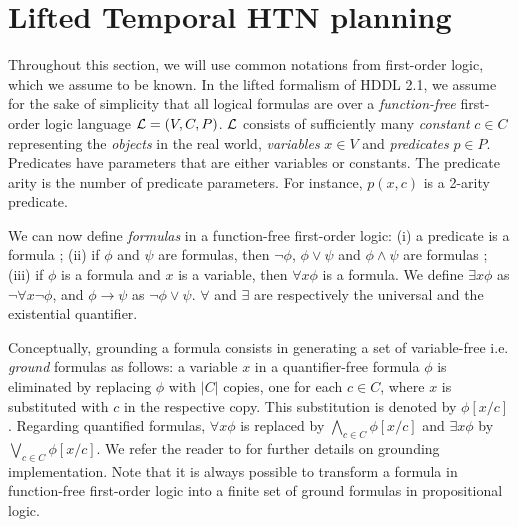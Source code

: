 \documentclass[letterpaper]{article} %
\begin{document}
\section{Lifted Temporal HTN planning}


Throughout this section, we will use common notations from first-order logic, which we assume to be known. In the lifted formalism of HDDL 2.1, we assume for the sake of simplicity that all logical formulas are over a {\it function-free} first-order logic language ${\cal{L}} = (V, C, P)$. ${\cal{L}}$ consists of sufficiently many {\it constant} $c \in C$ representing the {\it objects} in the real world, {\it variables} $x \in V$ and {\it predicates} $p \in P$. Predicates have parameters that are either variables or constants. The predicate arity is the number of predicate parameters. For instance, $p(x, c)$ is a 2-arity predicate.

We can now define {\it formulas} in a function-free first-order logic: (i) a predicate is a formula ; (ii) if ${\phi}$ and ${\psi}$ are formulas, then $\neg \phi$, $\phi \vee \psi$ and $\phi \wedge \psi$ are formulas ; (iii) if $\phi$ is a formula and $x$ is a variable, then $\forall x \phi$ is a formula. We define $\exists x \phi$ as $\neg \forall x \neg \phi$, and $\phi \rightarrow \psi$ as $\neg \phi \vee \psi$. $\forall$ and $\exists$ are respectively the universal and the existential quantifier.

Conceptually, grounding a formula consists in generating a set of variable-free i.e. {\it ground} formulas \cite{helmert} as follows: a variable $x$ in a quantifier-free formula $\phi$ is eliminated by replacing $\phi$ with $|C|$ copies, one for each $c \in C$, where $x$ is substituted with $c$ in the respective copy. This substitution is denoted by $\phi[x/c]$. Regarding quantified formulas, $\forall x \phi$ is replaced by $\bigwedge_{c \in C} \phi[x/c]$ and $\exists x \phi$ by $\bigvee_{c \in C} \phi[x/c]$. We refer the reader to \cite{behnke20,ramoul17} for further details on grounding implementation. Note that it is always possible to transform a formula in function-free first-order logic into a finite set of ground formulas in propositional logic.
\end{document}
